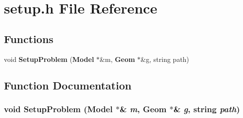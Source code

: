 \section{setup.h File Reference}
\label{setup_8h}
\subsection*{Functions}
\begin{CompactItemize}
\item 
void {\bf Setup\-Problem} ({\bf Model} $\ast$\&m, {\bf Geom} $\ast$\&g, string path)
\end{CompactItemize}


\subsection{Function Documentation}
\subsubsection{\setlength{\rightskip}{0pt plus 5cm}void Setup\-Problem ({\bf Model} $\ast$\& {\em m}, {\bf Geom} $\ast$\& {\em g}, string {\em path})}\label{setup_8h_a0}


